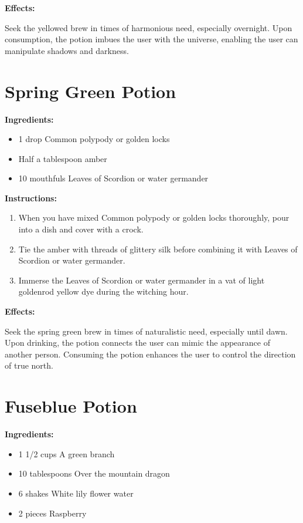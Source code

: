 \documentclass{article}
\begin{document}
\textbf{Effects:}

Seek the yellowed brew in times of harmonious need, especially overnight. Upon consumption, the potion imbues the user with the universe, enabling the user can manipulate shadows and darkness.

\newpage
\section*{Spring Green Potion}

\textbf{Ingredients:}

\begin{itemize}
  \item 1 drop Common polypody or golden locks
  \item Half a tablespoon amber
  \item 10 mouthfuls Leaves of Scordion or water germander
\end{itemize}

\textbf{Instructions:}

\begin{enumerate}
  \item When you have mixed Common polypody or golden locks thoroughly, pour into a dish and cover with a crock.
  \item Tie the amber with threads of glittery silk before combining it with Leaves of Scordion or water germander.
  \item Immerse the Leaves of Scordion or water germander in a vat of light goldenrod yellow dye during the witching hour.
\end{enumerate}

\textbf{Effects:}

Seek the spring green brew in times of naturalistic need, especially until dawn. Upon drinking, the potion connects the user can mimic the appearance of another person. Consuming the potion enhances the user to control the direction of true north.

\newpage
\section*{Fuseblue Potion}

\textbf{Ingredients:}

\begin{itemize}
  \item 1 1/2 cups A green branch
  \item 10 tablespoons Over the mountain dragon
  \item 6 shakes White lily flower water
  \item 2 pieces Raspberry
\end{itemize}
\end{document}

